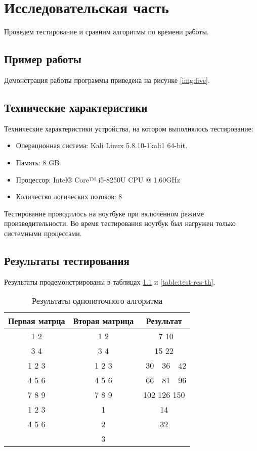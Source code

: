 \chapter{Исследовательская часть}

Проведем тестирование и сравним алгоритмы по времени работы.

\section{Пример работы}

Демонстрация работы программы приведена на рисунке \ref{img:five}.


\section{Технические характеристики}

Технические характеристики устройства, на котором выполнялось тестирование:

\begin{itemize}
	\item Операционная система: Kali \cite{kali} Linux \cite{linux} 5.8.10-1kali1 64-bit.
	\item Память: 8 GB.
	\item Процессор: Intel® Core™ i5-8250U \cite{intel} CPU @ 1.60GHz
	\item Количество логических потоков: 8
\end{itemize}

Тестирование проводилось на ноутбуке при включённом режиме производительности. Во время тестирования ноутбук был нагружен только системными процессами.


\section{Результаты тестирования}

Результаты продемонстрированы в таблицах \ref{table:test-res} и \ref{table:test-res-th}.

\begin{table}[h]
	\caption{Результаты однопоточного алгоритма}
	\label{table:test-res}
	\centering
	\begin{tabular}{|c|c|c|}
		\hline
		Первая матрца & Вторая матрица & Результат \\
		\hline
		1 2 & 1 2 & \ 7 10 \\
		3 4 & 3 4 & 15 22 \\
		\hline
		1 2 3 & 1 2 3 & \ 30\ \ 36\ \ 42 \\
		4 5 6 & 4 5 6 & \ 66\ \ 81\ \ 96 \\
		7 8 9 & 7 8 9 & 102 126 150 \\
		\hline
		1 2 3 & 1 & 14 \\
		4 5 6 & 2 & 32 \\
		& 3 & \\
		\hline
	\end{tabular}
\end{table}

